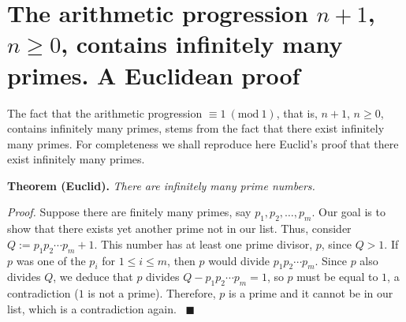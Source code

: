 \documentclass[a4paper, 12pt]{article}
\theoremstyle{definition}
\newcommand{\Mod}[1]{\ (\mathrm{mod}\ #1)} %
\renewcommand\title{\textbf{The arithmetic progression $n+1$, $n\geqslant0$, contains infinitely many primes.\\ A Euclidean proof}}
\begin{document}
	\thispagestyle{plain}
	\sloppy
	\section{The arithmetic progression $n+1$, $n\geqslant0$, contains infinitely many primes. A Euclidean proof}

	The fact that the arithmetic progression $\equiv 1 \Mod{1}$, that is, $n+1$, $n\geqslant0$, contains infinitely many primes, stems from the fact that there exist infinitely many primes. For completeness we shall reproduce here Euclid's proof that there exist infinitely many primes.
	
\textbf{Theorem (Euclid).} \emph{There are infinitely many prime numbers.}

	\textit{Proof.} Suppose there are finitely many primes, say $p_1,p_2,\dots,p_m$. Our goal is to show that there exists yet another prime not in our list. Thus, consider $Q:=p_1p_2\cdots p_m+1$. This number has at least one prime divisor, $p$, since $Q>1$. If $p$ was one of the $p_i$ for $1\leqslant i \leqslant m$, then $p$ would divide $p_1p_2\cdots p_m$. Since $p$ also divides $Q$, we deduce that $p$ divides $Q-p_1p_2\cdots p_m=1$, so $p$ must be equal to $1$, a contradiction ($1$ is not a prime). Therefore, $p$ is a prime and it cannot be in our list, which is a contradiction again. \ $\blacksquare$
	
\end{document}
